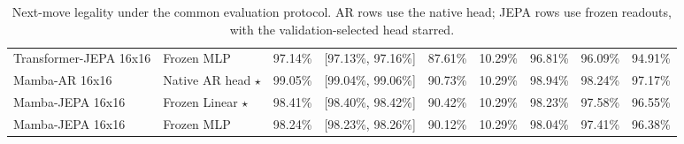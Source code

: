 \begin{table}[t]
\begin{tabular}{lllllllll}
Transformer-JEPA 16x16 & Frozen MLP & 97.14\% & [97.13\%, 97.16\%] & 87.61\% & 10.29\% & 96.81\% & 96.09\% & 94.91\% \\
Mamba-AR 16x16 & Native AR head $\star$ & 99.05\% & [99.04\%, 99.06\%] & 90.73\% & 10.29\% & 98.94\% & 98.24\% & 97.17\% \\
Mamba-JEPA 16x16 & Frozen Linear $\star$ & 98.41\% & [98.40\%, 98.42\%] & 90.42\% & 10.29\% & 98.23\% & 97.58\% & 96.55\% \\
Mamba-JEPA 16x16 & Frozen MLP & 98.24\% & [98.23\%, 98.26\%] & 90.12\% & 10.29\% & 98.04\% & 97.41\% & 96.38\% \\
\bottomrule
\end{tabular}
\caption{Next-move legality under the common evaluation protocol. AR rows use the native head; JEPA rows use frozen readouts, with the validation-selected head starred.}
\label{tab:legality}
\end{table}


